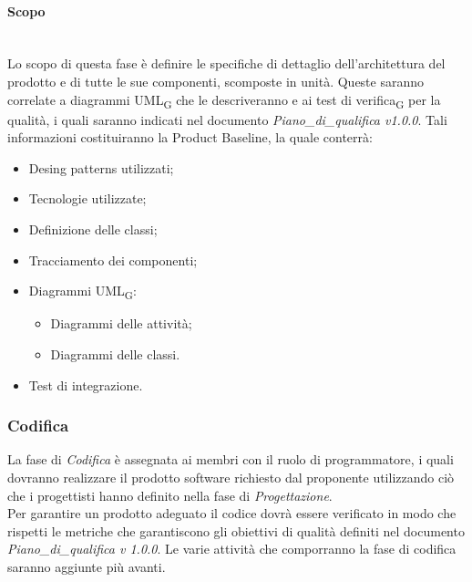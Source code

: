 	\paragraph {Scopo}\mbox{}\\
	Lo scopo di questa fase è definire le specifiche di dettaglio dell’architettura del prodotto e di tutte le sue componenti, scomposte in unità. Queste saranno correlate a diagrammi UML\textsubscript{G} che le descriveranno e ai test di verifica\textsubscript{G} per la qualità, i quali saranno indicati nel documento \textit{Piano\_di\_qualifica v1.0.0}. Tali informazioni costituiranno la Product Baseline, la quale conterrà:
	\begin{itemize}
		\item Desing patterns utilizzati;
		\item Tecnologie utilizzate;
		\item Definizione delle classi;
		\item Tracciamento dei componenti;
		\item Diagrammi UML\textsubscript{G}:
		\begin{itemize}
			\item Diagrammi delle attività;
			\item Diagrammi delle classi.
		\end{itemize}
		\item Test di integrazione.
	\end{itemize}
	\subsubsection{Codifica}
	La fase di \textit{Codifica} è assegnata ai membri con il ruolo di programmatore, i quali dovranno realizzare il prodotto software richiesto dal proponente utilizzando ciò che i progettisti hanno definito nella fase di \textit{Progettazione}.\\
	Per garantire un prodotto adeguato il codice dovrà essere verificato in modo che rispetti le metriche che garantiscono gli obiettivi di qualità definiti nel documento \textit{Piano\_di\_qualifica v 1.0.0}.
	Le varie attività che comporranno la fase di codifica saranno aggiunte più avanti. 

    
    
